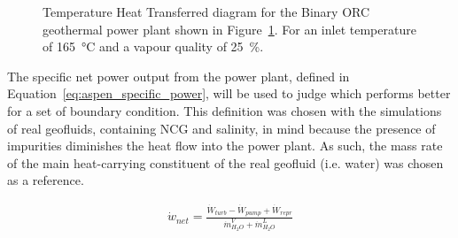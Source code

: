     \begin{figure}[H]
        \centering
        \resizebox{\linewidth}{!}{}
        \caption{Temperature Heat Transferred diagram for the Binary \ac{ORC} geothermal power plant shown in Figure~\ref{fig:aspen_binarORC}. For an inlet temperature of \qty{165}{\degreeCelsius} and a vapour quality of \qty{25}{\percent}.}
        \label{fig:aspen_binarORC}
    \end{figure}  

    
    The specific net power output from the power plant, defined in Equation~\ref{eq:aspen_specific_power}, will be used to judge which performs better for a set of boundary condition. This definition was chosen with the simulations of real geofluids, containing \ac{NCG} and salinity, in mind because the presence of impurities diminishes the heat flow into the power plant. As such, the mass rate of the main heat-carrying constituent of the real geofluid (i.e. water) was chosen as a reference. 

    \begin{align}
        \Dot{w}_{net} = \frac{\Dot{W}_{turb}-\Dot{W}_{pump} + \Dot{W}_{repr}}{\Dot{m}_{H_2O}^V+\Dot{m}_{H_2O}^L}\label{eq:aspen_specific_power}
    \end{align}

